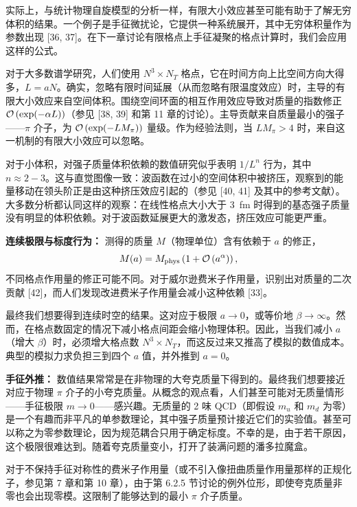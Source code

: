 实际上，与统计物理自旋模型的分析一样，有限大小效应甚至可能有助于了解无穷体积的结果。一个例子是手征微扰论，它提供一种系统展开，其中无穷体积量作为参数出现 [36, 37]。在下一章讨论有限格点上手征凝聚的格点计算时，我们会应用这样的公式。

对于大多数谱学研究，人们使用 $N^3 \times N_T$ 格点，它在时间方向上比空间方向大得多，$L = aN$。确实，忽略有限时间延展（从而忽略有限温度效应）时，主导的有限大小效应来自空间体积。围绕空间环面的相互作用效应导致对质量的指数修正 $\mathcal{O}\left(\exp(-\alpha L)\right)$（参见 [38, 39] 和第 11 章的讨论）。主导贡献来自质量最小的强子——$\pi$ 介子，为 $\mathcal{O}\left(\exp(-L M_\pi)\right)$ 量级。作为经验法则，当 $L M_\pi > 4$ 时，来自这一机制的有限大小效应可以忽略。

对于小体积，对强子质量体积依赖的数值研究似乎表明 $1/L^n$ 行为，其中 $n \approx 2{-}3$。这与直觉图像一致：波函数在过小的空间体积中被挤压，观察到的能量移动在领头阶正是由这种挤压效应引起的（参见 [40, 41] 及其中的参考文献）。大多数分析都认同这样的观察：在线性格点大小大于 3~fm 时得到的基态强子质量没有明显的体积依赖。对于波函数延展更大的激发态，挤压效应可能更严重。

\textbf{连续极限与标度行为：} 测得的质量 $M$（物理单位）含有依赖于 $a$ 的修正，
\begin{equation}
  M(a) = M_{\rm phys}\left( 1 + \mathcal{O}\left(a^\alpha\right) \right),
\end{equation}
不同格点作用量的修正可能不同。对于威尔逊费米子作用量，识别出对质量的二次贡献 [42]，而人们发现改进费米子作用量会减小这种依赖 [33]。

最终我们想要得到连续时空的结果。这对应于极限 $a \to 0$，或等价地 $\beta \to \infty$。然而，在格点数固定的情况下减小格点间距会缩小物理体积。因此，当我们减小 $a$（增大 $\beta$）时，必须增大格点数 $N^3 \times N_T$，而这反过来又推高了模拟的数值成本。典型的模拟力求负担三到四个 $a$ 值，并外推到 $a = 0$。

\textbf{手征外推：} 数值结果常常是在非物理的大夸克质量下得到的。最终我们想要接近对应于物理 $\pi$ 介子的小夸克质量。从概念的观点看，人们甚至可能对无质量情形——手征极限 $m \to 0$——感兴趣。无质量的 2 味 QCD（即假设 $m_u$ 和 $m_d$ 为零）是一个有趣而非平凡的单参数理论，其中强子质量预计接近它们的实验值。甚至可以称之为零参数理论，因为规范耦合只用于确定标度。不幸的是，由于若干原因，这个极限很难达到。随着夸克质量变小，打开了装满问题的潘多拉魔盒。

对于不保持手征对称性的费米子作用量（或不引入像扭曲质量作用量那样的正规化子，参见第 7 章和第 10 章），由于第 6.2.5 节讨论的例外位形，即使夸克质量非零也会出现零模。这限制了能够达到的最小 $\pi$ 介子质量。

